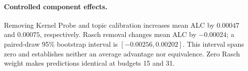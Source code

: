 \paragraph{Controlled component effects.} Removing Kernel Probe and topic calibration increases mean ALC by $0.00047$ and $0.00075$, respectively. Rasch removal changes mean ALC by $-0.00024$; a paired-draw 95\% bootstrap interval is $[-0.00256, 0.00202]$. This interval spans zero and establishes neither an average advantage nor equivalence. Zero Rasch weight makes predictions identical at budgets 15 and 31.

